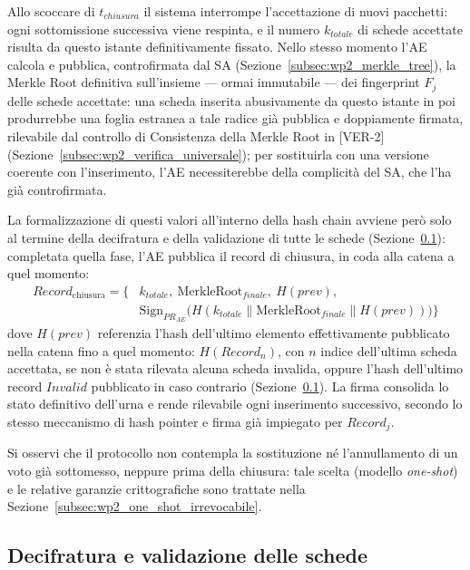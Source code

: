 Allo scoccare di $t_{chiusura}$ il sistema interrompe l'accettazione di nuovi pacchetti: ogni sottomissione successiva viene respinta, e il numero $k_{totale}$ di schede accettate risulta da questo istante definitivamente fissato. Nello stesso momento l'AE calcola e pubblica, controfirmata dal SA (Sezione~\ref{subsec:wp2_merkle_tree}), la Merkle Root definitiva sull'insieme --- ormai immutabile --- dei fingerprint $F_j$ delle schede accettate: una scheda inserita abusivamente da questo istante in poi produrrebbe una foglia estranea a tale radice già pubblica e doppiamente firmata, rilevabile dal controllo di Consistenza della Merkle Root in [VER-2] (Sezione~\ref{subsec:wp2_verifica_universale}); per sostituirla con una versione coerente con l'inserimento, l'AE necessiterebbe della complicità del SA, che l'ha già controfirmata.

La formalizzazione di questi valori all'interno della hash chain avviene però solo al termine della decifratura e della validazione di tutte le schede (Sezione~\ref{subsec:wp2_decifratura_validazione}): completata quella fase, l'AE pubblica il record di chiusura, in coda alla catena a quel momento:
\begin{equation*}
\begin{split}
Record_{\text{chiusura}} = \{ & k_{totale},\ \text{MerkleRoot}_{finale},\ H(prev),\ \\
& \text{Sign}_{PR_{AE}}\bigl(H(k_{totale} \parallel \text{MerkleRoot}_{finale} \parallel H(prev))\bigr) \}
\end{split}
\end{equation*}
dove $H(prev)$ referenzia l'hash dell'ultimo elemento effettivamente pubblicato nella catena fino a quel momento: $H(Record_n)$, con $n$ indice dell'ultima scheda accettata, se non è stata rilevata alcuna scheda invalida, oppure l'hash dell'ultimo record $Invalid$ pubblicato in caso contrario (Sezione~\ref{subsec:wp2_decifratura_validazione}). La firma consolida lo stato definitivo dell'urna e rende rilevabile ogni inserimento successivo, secondo lo stesso meccanismo di hash pointer e firma già impiegato per $Record_j$.

Si osservi che il protocollo non contempla la sostituzione né l'annullamento di un voto già sottomesso, neppure prima della chiusura: tale scelta (modello \textit{one-shot}) e le relative garanzie crittografiche sono trattate nella Sezione~\ref{subsec:wp2_one_shot_irrevocabile}.

\subsection{Decifratura e validazione delle schede}
\label{subsec:wp2_decifratura_validazione}

